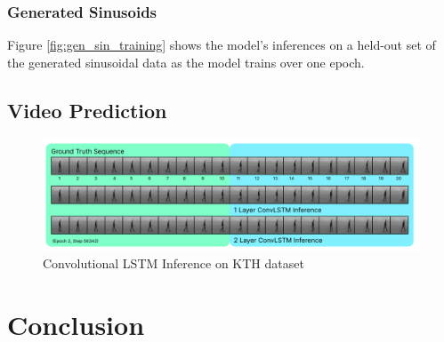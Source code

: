 \documentclass{scrartcl}
\begin{document}
\subsubsection{Generated Sinusoids}
\label{subsubsec:generated_sins}

Figure \ref{fig:gen_sin_training} shows the model's inferences on a held-out
set of the generated sinusoidal data as the model trains over one epoch. 

\subsection{Video Prediction}
\label{subsec:experiment_vp}

\begin{figure}[H]
	\begin{center}
		\includegraphics[width=1\textwidth]{images/kth/KTHEpoch2Step56342.png}
	\end{center}
	\caption{Convolutional LSTM Inference on KTH dataset}
	\label{img:lstm_kth_inference}
\end{figure}

\newpage
\section{Conclusion}
\label{sec:conclusion}


\newpage

\newpage
\end{document}
